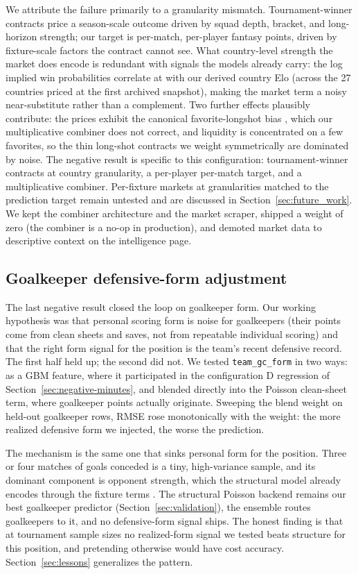 We attribute the failure primarily to a granularity mismatch.
Tournament-winner contracts price a season-scale outcome driven by
squad depth, bracket, and long-horizon strength; our target is
per-match, per-player fantasy points, driven by fixture-scale
factors the contract cannot see. What country-level strength the
market does encode is redundant with signals the models already
carry: the log implied win probabilities correlate at \MarketEloCorr{}
with our derived country Elo (across the 27 countries priced at the
first archived snapshot),
making the market term a noisy near-substitute rather than a
complement. Two further effects plausibly contribute: the prices
exhibit the canonical favorite-longshot bias
\citep{thaler1988favorite, snowberg2010explaining}, which our
multiplicative combiner does not correct, and liquidity is
concentrated on a few favorites, so the thin long-shot contracts we
weight symmetrically are dominated by noise. The negative result is
specific to this configuration: tournament-winner contracts at
country granularity, a per-player per-match target, and a
multiplicative combiner. Per-fixture markets at granularities matched
to the prediction target remain untested and are discussed in
Section~\ref{sec:future_work}. We kept the combiner architecture and
the market scraper, shipped a weight of zero (the combiner is a
no-op in production), and demoted market data to descriptive context
on the intelligence page.

\subsection{Goalkeeper defensive-form adjustment}
\label{sec:negative-gk-form}

The last negative result closed the loop on goalkeeper form. Our
working hypothesis was that personal scoring form is noise for
goalkeepers (their points come from clean sheets and saves, not from
repeatable individual scoring) and that the right form signal for the
position is the team's recent defensive record. The first half held
up; the second did not. We tested \texttt{team\_gc\_form} in two
ways: as a GBM feature, where it participated in the configuration D
regression of Section~\ref{sec:negative-minutes}, and blended
directly into the Poisson clean-sheet term, where goalkeeper points
actually originate. Sweeping the blend weight on held-out goalkeeper
rows, RMSE rose monotonically with the weight: the more realized
defensive form we injected, the worse the prediction.

The mechanism is the same one that sinks personal form for the
position. Three or four matches of goals conceded is a tiny,
high-variance sample, and its dominant component is opponent
strength, which the structural model already encodes through the
fixture terms \citep{maher1982modelling, dixon1997modelling}. The
structural Poisson backend remains our best goalkeeper predictor
(Section~\ref{sec:validation}), the ensemble routes goalkeepers to
it, and no defensive-form signal ships. The honest finding is that at
tournament sample sizes no realized-form signal we tested beats
structure for this position, and pretending otherwise would have cost
accuracy. Section~\ref{sec:lessons} generalizes the pattern.
